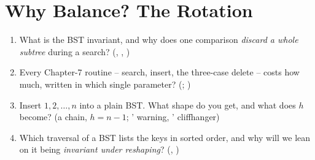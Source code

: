 \section{Why Balance? The Rotation}\label{sec:c06-rotations}

\begin{previouslybox}
\begin{enumerate}[nosep, leftmargin=1.6em]
  \item What is the BST invariant, and why does one comparison \emph{discard a whole subtree} during
        a search? (, , )
  \item Every Chapter-7 routine -- search, insert, the three-case delete -- costs how much, written
        in which single parameter? (; )
  \item Insert $1,2,\dots,n$ into a plain BST. What shape do you get, and what does $h$ become?
        (a chain, $h=n-1$; ' warning, ' cliffhanger)
  \item Which traversal of a BST lists the keys in sorted order, and why will we lean on it being
        \emph{invariant under reshaping}? (, )
\end{enumerate}
\end{previouslybox}

